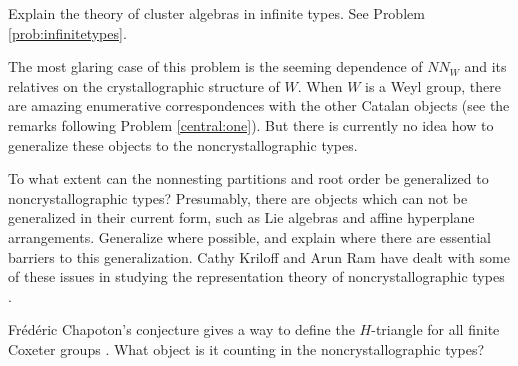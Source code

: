 \documentclass[12pt,letterpaper, reqno]{amsart}
\begin{document}
\begin{problemblock}
\begin{remark}
Explain the theory of cluster algebras in infinite types. See Problem \ref{prob:infinitetypes}.
\end{remark}

\begin{remark}
 The most glaring case of this problem is the seeming dependence of $NN_W$ and its relatives on the crystallographic structure of $W$. When $W$ is a Weyl group, there are amazing enumerative correspondences with the other Catalan objects (see the remarks following Problem \ref{central:one}). But there is currently no idea how to generalize these objects to the noncrystallographic types.

To what extent can the nonnesting partitions and root order be generalized to noncrystallographic types? Presumably, there are objects which can not be generalized in their current form, such as Lie algebras and affine hyperplane arrangements. Generalize where possible, and explain where there are essential barriers to this generalization. Cathy Kriloff and Arun Ram have dealt with some of these issues in studying the representation theory of noncrystallographic types \cite{kriloff-ram}.

Fr\'ed\'eric Chapoton's conjecture gives a way to define the $H$-triangle for all finite Coxeter groups \cite{chapoton:two}. What object is it counting in the noncrystallographic types?
\end{remark}

\end{problemblock}
\end{document}
